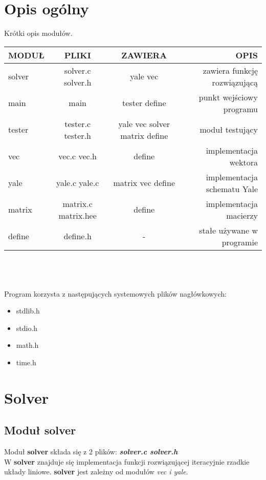 \documentclass[bibtotocnumbered, headsepline,normalheadings,12pt,polish]{scrreprt}
\begin{document}
\section{Opis ogólny}
\normalsize
Krótki opis modułów.\\
\begin{tabular}{| l || c | c || r |}
\hline
MODUŁ & PLIKI & ZAWIERA & OPIS \\ \hline \hline
solver & solver.c solver.h & yale vec & zawiera funkcję rozwiązującą\\
main & main & tester define & punkt wejściowy programu\\
tester & tester.c tester.h & yale vec solver matrix define & moduł testujący\\
vec & vec.c vec.h & define & implementacja wektora\\
yale & yale.c yale.c & matrix vec define & implementacja schematu Yale\\
matrix & matrix.c matrix.hee & define & implementacja macierzy\\
define & define.h & - & stałe używane w programie\\
\hline
\end{tabular}
\\
\\ \\
Program korzysta z następujących systemowych plików nagłówkowych:
\begin{itemize}
\item stdlib.h
\item stdio.h
\item math.h
\item time.h
\end{itemize}


\section{Solver}
\subsection{Moduł solver}
\normalsize
Moduł \textbf{solver} składa się z 2 plików: \textit{\textbf{solver.c solver.h}} \\
W \textbf{solver} znajduje się implementacja funkcji rozwiązującej iteracyjnie rzadkie układy liniowe.
\textbf{solver} jest zależny od \large modułów \emph{vec i yale}.\normalsize\\
\noindent
\end{document}
